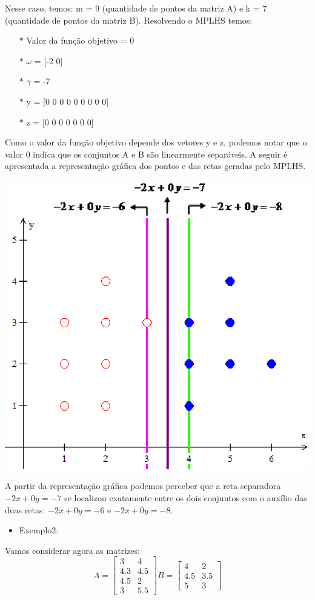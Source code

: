 Nesse caso, temos: m = 9 (quantidade de pontos da matriz A) e k = 7 (quantidade de pontos da matriz B).  Resolvendo o MPLHS temos:
\begin{itemize}
\item[$\ast$] Valor da função objetivo = 0
\item[$\ast$] $\omega$ = [-2  0]
\item[$\ast$] $\gamma$ = -7
\item[$\ast$] y = [0 0 0 0 0 0 0 0 0]
\item[$\ast$] z = [0 0 0 0 0 0 0]
\end{itemize}
Como o valor da função objetivo depende dos vetores y e z, podemos notar que o valor 0 indica que os conjuntos A e B são linearmente separáveis. A seguir é apresentada a representação gráfica dos pontos e das retas geradas pelo MPLHS.

\begin{center}
	\includegraphics[scale=0.5]{graficos/exemplo2}
	\label{img:ex1}
\end{center}

A partir da representação gráfica podemos perceber que a reta separadora $-2x + 0y = -7$ se localizou exatamente entre os dois conjuntos com o auxílio das duas retas: $-2x + 0y = -6$ e $-2x + 0y = -8$.

\begin{itemize}
\item Exemplo2:
\end{itemize}
Vamos  considerar agora as matrizes:
$$A=\begin{bmatrix}3 & 4\\ 4.3 & 4.5\\ 4.5 & 2\\ 3 & 5.5\end{bmatrix}
B=\begin{bmatrix}4 & 2\\ 4.5 & 3.5\\ 5 & 3\end{bmatrix}$$

